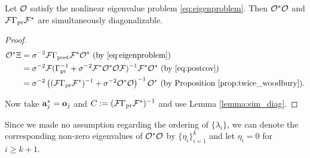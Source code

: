 \begin{proposition}\label{prop:same_ev}
  Let $\mathcal{O}$ satisfy the nonlinear eigenvalue problem
  \eqref{eq:eigenproblem}. Then $\mathcal{O}^*\mathcal{O}$ and $\mathcal{F} \Gamma_{\textup{pr}} \mathcal{F}^*$
  are simultaneously diagonalizable.
\end{proposition}
\begin{proof}
  \begin{align}\label{eq:mod_conditions}
    \begin{split}
      \obs^* \Xi &= \sigma^{-2}\fwd \postcov \fwd^* \obs^*  \text{ (by \eqref{eq:eigenproblem})}\\
      &= \sigma^{-2} \fwd( \prcov^{-1} + \sigma^{-2}  \fwd^* \obs^* \obs \fwd )^{-1} \fwd^* \obs^*  \text{ (by \eqref{eq:postcov})} \\
      &= \sigma^{-2} \left ( (\fwd\prcov\fwd^*)^{-1} + \sigma^{-2}  \obs^* \obs \right )^{-1} \obs^* \text{ (by Proposition \ref{prop:twice_woodbury})}.
    \end{split}
  \end{align}

  Now take $\mathbf{a}_j^{*} = \mathbf{o}_j$ and $C := (\mathcal{F} \Gamma_{\textup{pr}}
  \mathcal{F}^*)^{-1}$ and use Lemma \ref{lemma:sim_diag}.
\end{proof}

Since we made no assumption regarding the ordering of $\{\lambda_i\}$,
we can denote the corresponding non-zero eigenvalues of $\mathcal{O}^*\mathcal{O}$
by $\{\eta_i\}_{i=1}^{k}$ and let $\eta_i = 0$ for $i \geq k+1$.

